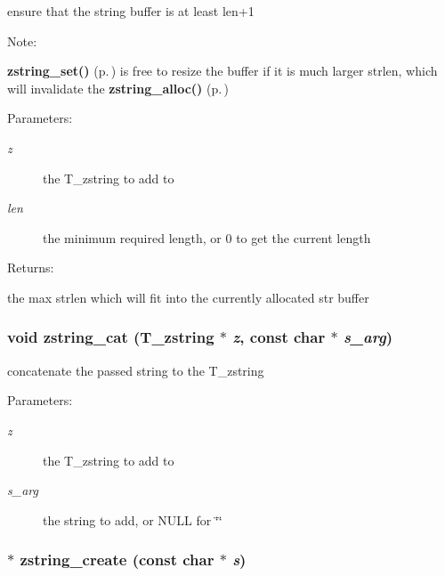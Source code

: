ensure that the string buffer is at least len+1  \begin{Desc}
\item[Note: ]\par
{\bf zstring\_\-set()} {\rm (p.\,\pageref{group__zstring_a2})} is free to resize the buffer if  it is much larger strlen, which will invalidate the {\bf zstring\_\-alloc()} {\rm (p.\,\pageref{group__zstring_a5})} \end{Desc}
\begin{Desc}
\item[Parameters: ]\par
\begin{description}
\item[{\em 
z}]the T\_\-zstring to add to \item[{\em 
len}]the minimum required length, or 0 to get the current length \end{description}
\end{Desc}
\begin{Desc}
\item[Returns: ]\par
the max strlen which will fit into the currently allocated str buffer \end{Desc}
\subsubsection{\setlength{\rightskip}{0pt plus 5cm}void zstring\_\-cat ({\bf T\_\-zstring} $\ast$ {\em z}, const char $\ast$ {\em s\_\-arg})}\label{group__zstring_a4}


concatenate the passed string to the T\_\-zstring\begin{Desc}
\item[Parameters: ]\par
\begin{description}
\item[{\em 
z}]the T\_\-zstring to add to \item[{\em 
s\_\-arg}]the string to add, or NULL for \char`\"{}\char`\"{} \end{description}
\end{Desc}
\subsubsection{$\ast$ zstring\_\-create (const char $\ast$ {\em s})}\label{group__zstring_a0}


